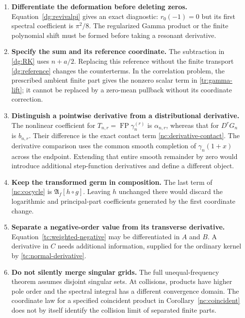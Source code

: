 \documentclass[11pt,a4paper]{article}
\numberwithin{equation}{section}
\theoremstyle{definition}
\theoremstyle{remark}
\DeclareMathOperator{\FP}{FP}
\begin{document}
\begin{enumerate}
\item \textbf{Differentiate the deformation before deleting zeros.}
Equation~\eqref{dg:revivalpi} gives an exact diagnostic:
$r_0(-1)=0$ but its first spectral coefficient is $\pi^2/8$.
The regularized Gamma product or the finite polynomial shift must be
formed before taking a resonant derivative.

\item \textbf{Specify the sum and its reference coordinate.}
The subtraction in \eqref{dg:RK} uses $n+a/2$. Replacing this reference
without the finite transport \eqref{dg:reference} changes the
counterterms. In the correlation problem, the prescribed ambient
finite part gives the nonzero scalar term in
\eqref{tr:gamma-lift}; it cannot be replaced by a
zero-mean pullback without its coordinate correction.

\item \textbf{Distinguish a pointwise derivative from a distributional
derivative.} The nonlinear coefficient for
$T_{n,r}=\FP\gamma_n^{(r)}$ is $\alpha_{n,r}$, whereas that for
$D^rG_n$ is $b_{n,r}$. Their difference is the exact contact term
\eqref{nc:derivative-contact}. The derivative comparison uses the
common smooth completion of $\gamma_n(1+x)$ across the endpoint.
Extending that entire smooth remainder by zero would introduce
additional step-function derivatives and define a different object.

\item \textbf{Keep the transformed germ in composition.}
The last term of \eqref{nc:cocycle} is
$\mathfrak A_f[h\circ g]$. Leaving $h$ unchanged there would
discard the logarithmic and principal-part coefficients generated
by the first coordinate change.

\item \textbf{Separate a negative-order value from its transverse
derivative.} Equation~\eqref{tc:weighted-negative} may be
differentiated in $A$ and $B$. A derivative in $C$ needs additional
information, supplied for the ordinary kernel by
\eqref{tc:normal-derivative}.

\item \textbf{Do not silently merge singular grids.}
The full unequal-frequency theorem assumes disjoint singular sets.
At collisions, products have higher pole order and the spectral
integral has a different convergence domain. The coordinate law for
a specified coincident product in Corollary~\ref{nc:coincident}
does not by itself identify the collision limit of separated
finite parts.
\end{enumerate}
\end{document}
